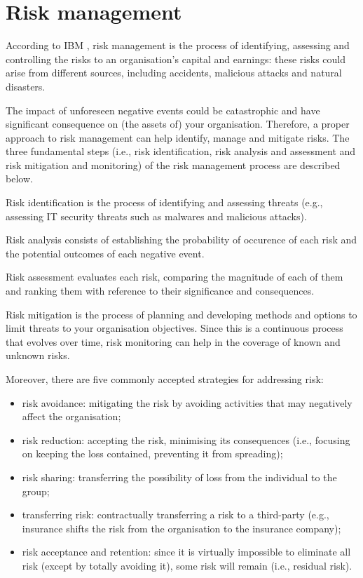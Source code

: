 \section{Risk management}
\label{chap:risk_management}
According to IBM \parencite{IBM_risk_management}, risk management is the process of identifying, assessing and controlling the risks to an organisation's capital and earnings: these risks could arise from different sources, including accidents, malicious attacks and natural disasters.

The impact of unforeseen negative events could be catastrophic and have significant consequence on (the assets of) your organisation.
Therefore, a proper approach to risk management can help identify, manage and mitigate risks.
The three fundamental steps (i.e., risk identification, risk analysis and assessment and risk mitigation and monitoring) of the risk management process are described below.

Risk identification is the process of identifying and assessing threats (e.g., assessing IT security threats such as malwares and malicious attacks).

Risk analysis consists of establishing the probability of occurence of each risk and the potential outcomes of each negative event.

Risk assessment evaluates each risk, comparing the magnitude of each of them and ranking them with reference to their significance and consequences.

Risk mitigation is the process of planning and developing methods and options to limit threats to your organisation objectives.
Since this is a continuous process that evolves over time, risk monitoring can help in the coverage of known and unknown risks.

Moreover, there are five commonly accepted strategies for addressing risk:
\begin{itemize}
    \item risk avoidance: mitigating the risk by avoiding activities that may negatively affect the organisation;
    \item risk reduction: accepting the risk, minimising its consequences (i.e., focusing on keeping the loss contained, preventing it from spreading);
    \item risk sharing: transferring the possibility of loss from the individual to the group;
    \item transferring risk: contractually transferring a risk to a third-party (e.g., insurance shifts the risk from the organisation to the insurance company);
    \item risk acceptance and retention: since it is virtually impossible to eliminate all risk (except by totally avoiding it), some risk will remain (i.e., residual risk).
\end{itemize}


